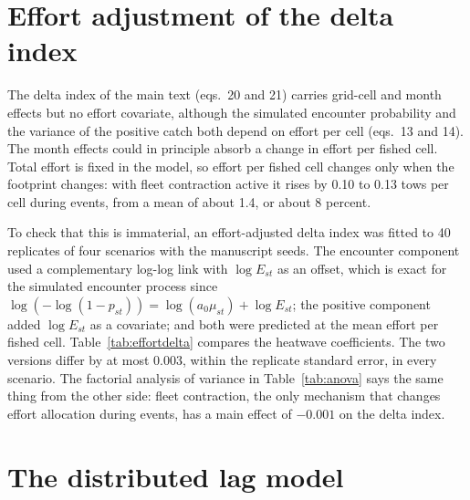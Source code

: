 \documentclass[11pt,a4paper]{article}
\begin{document}
\section{Effort adjustment of the delta index}
\label{sec:effort-delta}

The delta index of the main text (eqs.~20 and 21) carries grid-cell and month effects but no effort covariate, although the simulated encounter probability and the variance of the positive catch both depend on effort per cell (eqs.~13 and 14). The month effects could in principle absorb a change in effort per fished cell. Total effort is fixed in the model, so effort per fished cell changes only when the footprint changes: with fleet contraction active it rises by 0.10 to 0.13 tows per cell during events, from a mean of about 1.4, or about 8 percent.

To check that this is immaterial, an effort-adjusted delta index was fitted to 40 replicates of four scenarios with the manuscript seeds. The encounter component used a complementary log-log link with $\log E_{st}$ as an offset, which is exact for the simulated encounter process since $\log(-\log(1-p_{st})) = \log(a_0\mu_{st}) + \log E_{st}$; the positive component added $\log E_{st}$ as a covariate; and both were predicted at the mean effort per fished cell. Table~\ref{tab:effortdelta} compares the heatwave coefficients. The two versions differ by at most 0.003, within the replicate standard error, in every scenario. The factorial analysis of variance in Table~\ref{tab:anova} says the same thing from the other side: fleet contraction, the only mechanism that changes effort allocation during events, has a main effect of $-0.001$ on the delta index.


\section{The distributed lag model}
\label{sec:dlag}
\end{document}
